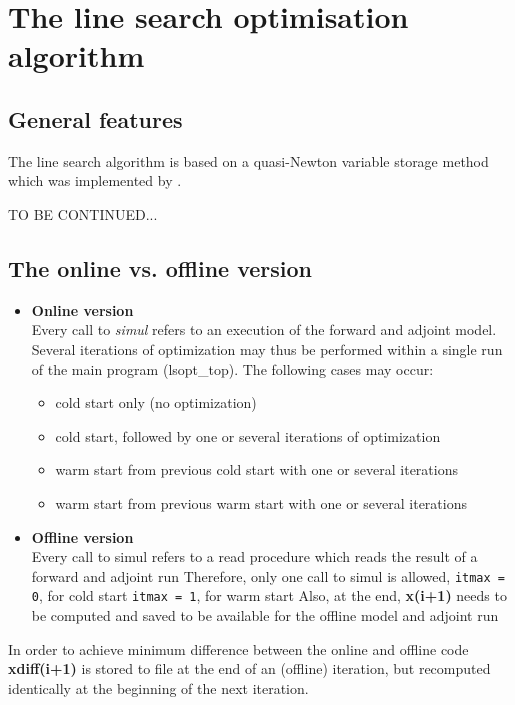 \section{The line search optimisation algorithm
\label{sectionoptim}}

\subsection{General features}

The line search algorithm is based on a quasi-Newton
variable storage method which was implemented by
\cite{gil-mar:89}.

TO BE CONTINUED...

\subsection{The online vs. offline version}

\begin{itemize}
%
\item {\bf Online version} \\
Every call to {\it simul} refers to an execution of the 
forward and adjoint model.
Several iterations of optimization may thus be performed within
a single run of the main program (lsopt\_top).
The following cases may occur:
%
\begin{itemize}
\item
cold start only (no optimization)
\item
cold start, followed by one or several iterations of optimization
\item
warm start from previous cold start with one or several iterations
\item
warm start from previous warm start with one or several iterations
\end{itemize}
%
\item {\bf Offline version} \\
Every call to simul refers to a read procedure which
reads the result of a forward and adjoint run
Therefore, only one call to simul is allowed,
                     {\tt itmax = 0}, for cold start
                     {\tt itmax = 1}, for warm start
Also, at the end, {\bf x(i+1)} needs to be computed and saved
to be available for the offline model and adjoint run
\end{itemize}

In order to achieve minimum difference between the online and offline code
{\bf xdiff(i+1)} is stored to file at the end of an (offline) iteration,
but recomputed identically at the beginning of the next iteration.


